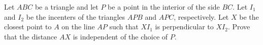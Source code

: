 Let $ABC$ be a triangle and let $P$ be a point in the interior of the side $BC$.
Let $I_1$ and $I_2$ be the incenters of the triangles $APB$ and $APC$, respectively.
Let $X$ be the closest point to $A$ on the line $AP$ such that $XI_1$ is perpendicular to $XI_2$.
Prove that the distance $AX$ is independent of the choice of $P$.
